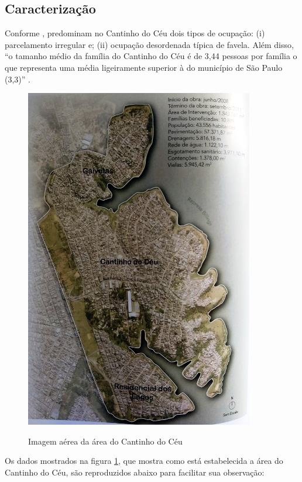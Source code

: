 	\subsection{Caracterização}
	
	Conforme , predominam no Cantinho do Céu dois tipos de ocupação: (i) parcelamento irregular e; (ii) ocupação desordenada típica de favela. Além disso, ``o tamanho médio da família do Cantinho do Céu é de 3,44 pessoas por família o que representa uma média ligeiramente superior à do município de São Paulo (3,3)'' \cite[p.110]{Barda2012}.
	
	\begin{figure}[htb]
		\centering
		\caption{Imagem aérea da área do Cantinho do Céu}
		\includegraphics[height=15cm]{img/barda_peninsula}
		\label{fig:peninsula}
	\end{figure}
	
	Os dados mostrados na figura \ref{fig:peninsula}, que mostra como está estabelecida a área do Cantinho do Céu, são reproduzidos abaixo para facilitar sua observação:
	
